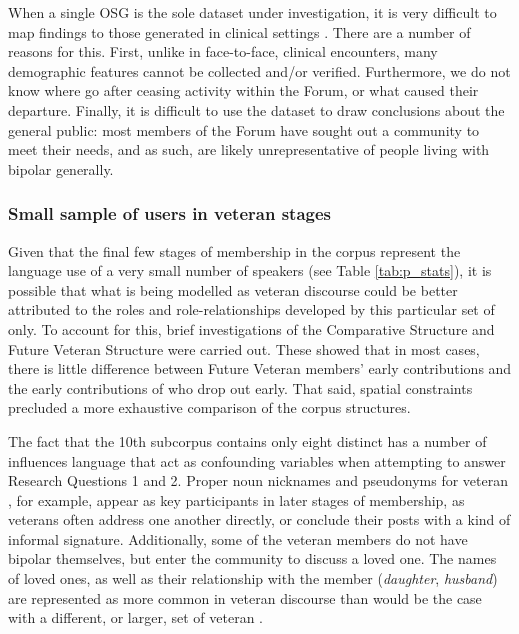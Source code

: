 When a single \gls{OSG} is the sole dataset under investigation, it is very difficult to map findings to those generated in clinical settings \textcite{maclean_forum77:_2015}. There are a number of reasons for this. First, unlike in face\hyp{}to\hyp{}face, clinical encounters, many demographic features cannot be collected and\slash or verified. Furthermore, we do not know where  go after ceasing activity within the \gls{Forum}, or what caused their departure. Finally, it is difficult to use the dataset to draw conclusions about the general public: most \glspl{member} of the \gls{Forum} have sought out a community to meet their needs, and as such, are likely unrepresentative of people living with \gls{bipolar} generally. %


\subsubsection*{Small sample of users in veteran stages}

Given that the final few stages of membership in the \gls{corpus} represent the language use of a very small number of speakers (see Table \ref{tab:p_stats}), it is possible that what is being modelled as veteran  discourse could be better attributed to the roles and role\hyp{}relationships developed by this particular set of  only. To account for this, brief investigations of the Comparative Structure and Future Veteran Structure were carried out. These showed that in most cases, there is little difference between Future Veteran members' early contributions and the early contributions of  who drop out early. That said, spatial constraints precluded a more exhaustive comparison of the corpus structures.

The fact that the 10th subcorpus contains only eight distinct  has a number of influences language that act as confounding variables when attempting to answer Research Questions 1 and 2. Proper noun nicknames and pseudonyms for veteran , for example, appear as key participants in later stages of membership, as veterans often address one another directly, or conclude their \glspl{post} with a kind of informal signature. Additionally, some of the veteran \glspl{member} do not have \gls{bipolar} themselves, but enter the community to discuss a loved one. The names of loved ones, as well as their relationship with the member (\emph{daughter}, \emph{husband}) are represented as more common in veteran discourse than would be the case with a different, or larger, set of veteran .

